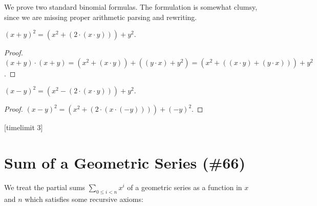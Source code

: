 \documentclass{article}
\begin{document}
%
We prove two standard binomial formulas. The formulation is
somewhat clumsy, since we are missing proper arithmetic
parsing and rewriting.
%
\begin{forthel}
[timelimit 10]
\begin{lemma}
$(x + y)^{2} = (x^{2} + (2 \cdot (x \cdot y))) + y^{2}$.
\end{lemma}
\begin{proof}
$(x + y) \cdot (x + y) =
(x^{2} + (x \cdot y)) + ((y \cdot x) + y^{2}) =
(x^{2} + ((x \cdot y) + (y \cdot x))) + y^{2}$.
\end{proof}

\begin{lemma}
$(x - y)^{2} = (x^{2} - (2 \cdot (x \cdot y))) + y^{2}$.
\end{lemma}
\begin{proof}
$(x - y)^{2} = (x^{2} + (2 \cdot (x \cdot (-y)))) + (-y)^{2}$.
\end{proof}
[timelimit 3]
\end{forthel}


\section{Sum of a Geometric Series (\#66)}

\newcommand{\sumgeom}[2]{\sum_{0 \leq i < #2} {#1}^i}


We treat the partial sums $\sumgeom{x}{n}$ of a geometric
series as a function in $x$ and $n$ which satisfies some
recursive axioms:
\end{document}
